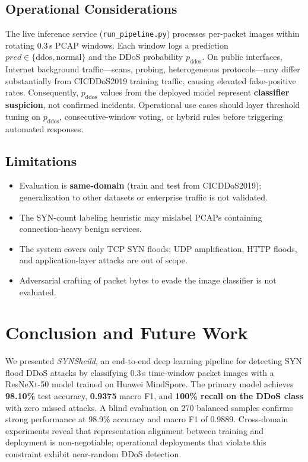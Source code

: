 \documentclass[conference]{IEEEtran}
\begin{document}
\subsection{Operational Considerations}
The live inference service (\texttt{run\_pipeline.py}) processes per-packet
images within rotating 0.3\,s PCAP windows. Each window logs a prediction
$\mathit{pred} \in \{\text{ddos}, \text{normal}\}$ and the DDoS probability
$p_\text{ddos}$.
On public interfaces, Internet background traffic—scans, probing, heterogeneous
protocols—may differ substantially from CICDDoS2019 training traffic, causing
elevated false-positive rates.
Consequently, $p_\text{ddos}$ values from the deployed model represent
\textbf{classifier suspicion}, not confirmed incidents.
Operational use cases should layer threshold tuning on $p_\text{ddos}$,
consecutive-window voting, or hybrid rules before triggering automated
responses.

\subsection{Limitations}
\begin{itemize}
  \item Evaluation is \textbf{same-domain} (train and test from CICDDoS2019);
        generalization to other datasets or enterprise traffic is not validated.
  \item The SYN-count labeling heuristic may mislabel PCAPs containing
        connection-heavy benign services.
  \item The system covers only TCP SYN floods; UDP amplification, HTTP floods,
        and application-layer attacks are out of scope.
  \item Adversarial crafting of packet bytes to evade the image classifier
        is not evaluated.
\end{itemize}

\section{Conclusion and Future Work}
\label{sec:conclusion}

We presented \textit{SYNSheild}, an end-to-end deep learning pipeline for
detecting SYN flood DDoS attacks by classifying 0.3\,s time-window packet
images with a ResNeXt-50 model trained on Huawei MindSpore.
The primary model achieves \textbf{98.10\%} test accuracy, \textbf{0.9375}
macro F1, and \textbf{100\% recall on the DDoS class} with zero missed attacks.
A blind evaluation on 270 balanced samples confirms strong performance at 98.9\%
accuracy and macro F1 of 0.9889.
Cross-domain experiments reveal that representation alignment between training
and deployment is non-negotiable; operational deployments that violate this
constraint exhibit near-random DDoS detection.
\end{document}

